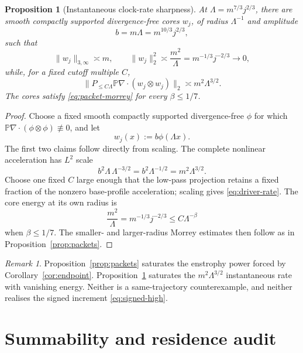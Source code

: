 \documentclass[11pt]{article}
\newtheorem{proposition}[theorem]{Proposition}
\theoremstyle{remark}
\newtheorem{remark}[theorem]{Remark}
\newcommand{\PP}{\mathbb P}
\begin{document}
\begin{proposition}[Instantaneous clock-rate sharpness]
\label{prop:driver}
At \(\Lambda=m^{7/3}j^{2/3}\), there are smooth compactly supported
divergence-free cores \(w_j\), of radius \(\Lambda^{-1}\) and amplitude
\[
 b=m\Lambda=m^{10/3}j^{2/3},
\]
such that
\begin{equation}
 \label{eq:driver-norms}
 \|w_j\|_{3,\infty}\asymp m,
 \qquad
 \|w_j\|_2^2
 \asymp\frac{m^2}{\Lambda}
 =m^{-1/3}j^{-2/3}\longrightarrow0,
\end{equation}
while, for a fixed cutoff multiple \(C\),
\begin{equation}
 \label{eq:driver-rate}
 \|P_{\leq C\Lambda}
 \PP\nabla\cdot(w_j\otimes w_j)\|_2
 \asymp m^2\Lambda^{3/2}.
\end{equation}
The cores satisfy \eqref{eq:packet-morrey} for every
\(\beta\leq1/7\).
\end{proposition}

\begin{proof}
Choose a fixed smooth compactly supported divergence-free
\(\phi\) for which
\(\PP\nabla\cdot(\phi\otimes\phi)\not\equiv0\), and let
\[
 w_j(x):=b\phi(\Lambda x).
\]
The first two claims follow directly from scaling.  The complete
nonlinear acceleration has \(L^2\) scale
\[
 b^2\Lambda\,\Lambda^{-3/2}
 =b^2\Lambda^{-1/2}
 =m^2\Lambda^{3/2}.
\]
Choose one fixed \(C\) large enough that the low-pass projection retains
a fixed fraction of the nonzero base-profile acceleration; scaling gives
\eqref{eq:driver-rate}.  The core energy at its own radius is
\[
 \frac{m^2}{\Lambda}
 =m^{-1/3}j^{-2/3}
 \leq C\Lambda^{-\beta}
\]
when \(\beta\leq1/7\).  The smaller- and larger-radius Morrey estimates
then follow as in Proposition~\ref{prop:packets}.
\end{proof}

\begin{remark}
Proposition~\ref{prop:packets} saturates the enstrophy power forced by
Corollary~\ref{cor:endpoint}.  Proposition~\ref{prop:driver} saturates
the \(m^2\Lambda^{3/2}\) instantaneous rate with vanishing energy.
Neither is a same-trajectory counterexample, and neither realises the
signed increment \eqref{eq:signed-high}.
\end{remark}

\section{Summability and residence audit}
\end{document}
